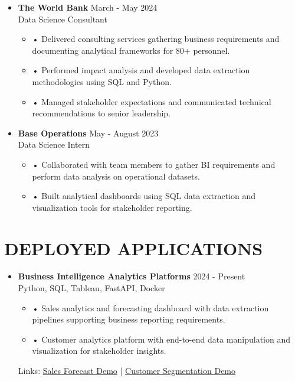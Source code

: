 \documentclass[a4paper,9pt]{extarticle}
\begin{document}
\noindent
\begin{itemize}[leftmargin=0.4cm, label={}]
    \item \textbf{The World Bank} \hfill March - May 2024 \\
    Data Science Consultant
    \vspace{-0.1cm}
    \begin{itemize}[leftmargin=0.3cm, label={}]
    \item \small{•} \normalsize{Delivered consulting services gathering business requirements and documenting analytical frameworks for 80+ personnel.}
    \item \small{•} \normalsize{Performed impact analysis and developed data extraction methodologies using SQL and Python.}
    \item \small{•} \normalsize{Managed stakeholder expectations and communicated technical recommendations to senior leadership.}
    \end{itemize}
\end{itemize}

\noindent
\begin{itemize}[leftmargin=0.4cm, label={}]
    \item \textbf{Base Operations} \hfill May - August 2023 \\
    Data Science Intern
    \vspace{-0.1cm}
    \begin{itemize}[leftmargin=0.3cm, label={}]
    \item \small{•} \normalsize{Collaborated with team members to gather BI requirements and perform data analysis on operational datasets.}
    \item \small{•} \normalsize{Built analytical dashboards using SQL data extraction and visualization tools for stakeholder reporting.}
    \end{itemize}
\end{itemize}

\section*{DEPLOYED APPLICATIONS}

\begin{itemize}[leftmargin=0.4cm, label={}]
    \item \textbf{Business Intelligence Analytics Platforms} \hfill 2024 - Present \\
    Python, SQL, Tableau, FastAPI, Docker
    \begin{itemize}[leftmargin=0.3cm, label={}]
    \item \small{•} \normalsize{Sales analytics and forecasting dashboard with data extraction pipelines supporting business reporting requirements.} 
    \item \small{•} \normalsize{Customer analytics platform with end-to-end data manipulation and visualization for stakeholder insights.}
    \end{itemize}
    Links: \href{https://twallett.com/sales-forecast}{Sales Forecast Demo} | \href{https://twallett.com/customer-segmentation}{Customer Segmentation Demo} 
\end{itemize}
\end{document}
